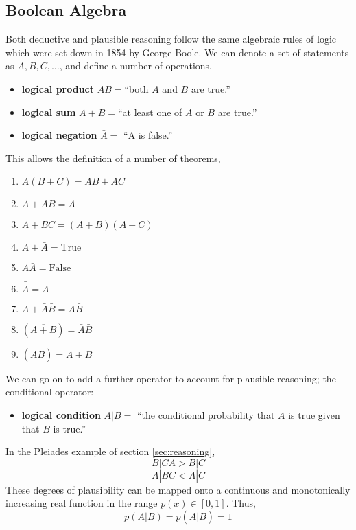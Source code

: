 \documentclass{dwnotes}         		        %
\begin{document}
\subsection{Boolean Algebra}
\label{sec:boolean}

Both deductive and plausible reasoning follow the same algebraic rules
of logic which were set down in 1854 by George Boole. We can denote a
set of statements as $A, B, C, \dots$, and define a number of
operations.
\begin{itemize}
\item \textbf{logical product} $AB=$``both $A$ and $B$ are true.''
\item \textbf{logical sum} $A+B=$``at least one of $A$ or $B$ are
  true.''
\item \textbf{logical negation} $\bar{A}=$ ``A is false.''
\end{itemize}
This allows the definition of a number of theorems,
\begin{enumerate}
\item $A(B+C) = AB + AC$
\item $A + AB = A$
\item $A + BC = (A+B)(A+C)$
\item $A + \bar A = \text{True}$
\item $A \bar A = \text{False}$
\item $\bar{\bar{A}} = A$
\item $A + \bar A \bar B = A \bar B$
\item $(\overline{A+B}) = \bar A \bar B$
\item $(\overline{AB}) = \bar A + \bar B$
\end{enumerate}
We can go on to add a further operator to account for plausible
reasoning; the conditional operator:
\begin{itemize}
\item \textbf{logical condition} $A|B=$ ``the conditional probability
  that $A$ is true given that $B$ is true.''
\end{itemize}
In the Pleiades example of section \ref{sec:reasoning},
\begin{equation}
  \label{eq:pleiades1}
  B | CA > B | C
\end{equation}
\begin{equation}
  \label{eq:pleiades2}
  A | \bar{B} C < A | C
\end{equation}
These degrees of plausibility can be mapped onto a continuous and
monotonically increasing real function in the range $p(x) \in [0,1]$.
Thus,
\begin{equation}
  \label{eq:plausibilitysum}
  p(A|B) = p(\bar A | B) = 1
\end{equation}
\end{document}
